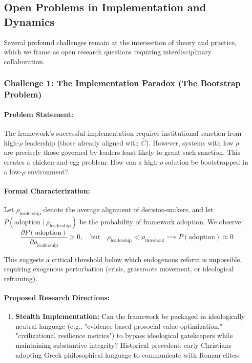 \documentclass[11pt,a4paper]{article}
\theoremstyle{definition}
\theoremstyle{remark}
\begin{document}
\begin{small}
\subsection{Open Problems in Implementation and Dynamics}

Several profound challenges remain at the intersection of theory and practice, which we frame as open research questions requiring interdisciplinary collaboration.

\subsubsection{Challenge 1: The Implementation Paradox (The Bootstrap Problem)}

\paragraph{Problem Statement:} 
The framework's successful implementation requires institutional sanction from high-\(\rho\) leadership (those already aligned with \(\hat{C}\)). However, systems with low \(\rho\) are precisely those governed by leaders least likely to grant such sanction. This creates a chicken-and-egg problem: How can a high-\(\rho\) solution be bootstrapped in a low-\(\rho\) environment?

\paragraph{Formal Characterization:}
Let \(\rho_{\text{leadership}}\) denote the average alignment of decision-makers, and let \(P(\text{adoption} \mid \rho_{\text{leadership}})\) be the probability of framework adoption. We observe:
\begin{equation}
\frac{\partial P(\text{adoption})}{\partial \rho_{\text{leadership}}} > 0, \quad \text{but} \quad \rho_{\text{leadership}} < \rho_{\text{threshold}} \implies P(\text{adoption}) \approx 0
\end{equation}

This suggests a critical threshold below which endogenous reform is impossible, requiring exogenous perturbation (crisis, grassroots movement, or ideological reframing).

\paragraph{Proposed Research Directions:}
\begin{enumerate}
    \item \textbf{Stealth Implementation:} Can the framework be packaged in ideologically neutral language (e.g., "evidence-based prosocial value optimization," "civilizational resilience metrics") to bypass ideological gatekeepers while maintaining substantive integrity? Historical precedent: early Christians adopting Greek philosophical language to communicate with Roman elites.
    

\end{enumerate}
\end{small}
\end{document}
